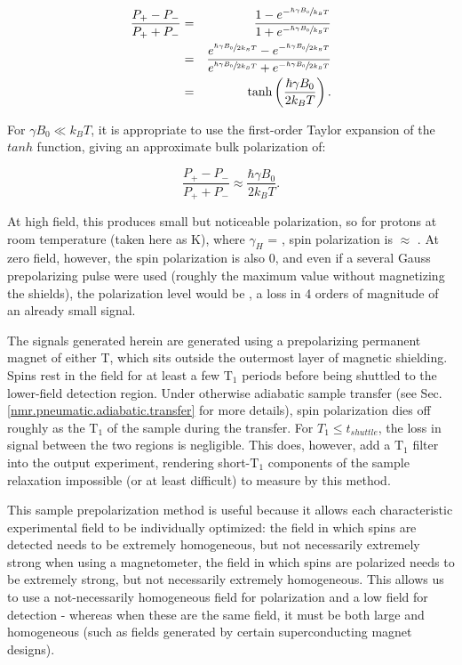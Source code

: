 \documentclass[PaulGanssle-Thesis.tex]{subfiles}
\begin{document}
\begin{eqnarray}
\frac{P_{+} - P_{-}}{P_{+} + P_{-}} & = & \frac{1-e^{-\sfrac{\hbar\gamma B_0}{k_{B}T}}}{1 + e^{-\sfrac{\hbar\gamma B_0}{k_{B}T}}} \label{eqn:SpinBoltzmannDist}\\
 & = & \frac{e^{\sfrac{\hbar\gamma{}B_0}{2k_{B}T}}-e^{-\sfrac{\hbar\gamma B_0}{2k_{B}T}}}{e^{\sfrac{\hbar\gamma B_0}{2k_{B}T}} + e^{-\sfrac{\hbar\gamma B_0}{2k_{B}T}}} \\
 & = & \mathrm{tanh}\left(\frac{\hbar\gamma{}B_0}{2k_{B}T}\right).
\end{eqnarray}


For $\gamma B_0 \ll k_{B}T$, it is appropriate to use the first-order Taylor expansion of the $tanh$ function, giving an approximate bulk polarization of:

\begin{equation}
\frac{P_{+} - P_{-}}{P_{+} + P_{-}} \approx \frac{\hbar\gamma B_0}{2k_{B}T}.
\end{equation}

At high field, this produces small but noticeable polarization, so for protons at room temperature (taken here as \unit[298]{K}), where $\gamma_{H}$ = , spin polarization is $\approx$ . At zero field, however, the spin polarization is also 0, and even if a several Gauss prepolarizing pulse were used (roughly the maximum value without magnetizing the shields), the polarization level would be , a loss in 4 orders of magnitude of an already small signal.

The signals generated herein are generated using a prepolarizing permanent magnet of either \unit[1 or 2]{T}, which sits outside the outermost layer of magnetic shielding. Spins rest in the field for at least a few $\mathrm{T}_1$ periods before being shuttled to the lower-field detection region. Under otherwise adiabatic sample transfer (see Sec. \ref{nmr.pneumatic.adiabatic.transfer} for more details), spin polarization dies off roughly as the $\mathrm{T}_1$ of the sample during the transfer. For $T_1 \leq t_{shuttle}$, the loss in signal between the two regions is negligible. This does, however, add a $\mathrm{T}_1$ filter into the output experiment, rendering short-$\mathrm{T}_1$ components of the sample relaxation impossible (or at least difficult) to measure by this method.

This sample prepolarization method is useful because it allows each characteristic experimental field to be individually optimized: the field in which spins are detected needs to be extremely homogeneous, but not necessarily extremely strong when using a magnetometer, the field in which spins are polarized needs to be extremely strong, but not necessarily extremely homogeneous. This allows us to use a not-necessarily homogeneous field for polarization and a low field for detection - whereas when these are the same field, it must be both large and homogeneous (such as fields generated by certain superconducting magnet designs). 
\end{document}
